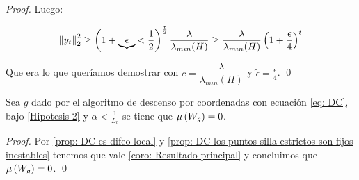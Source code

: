 \begin{proof}
	Luego:
	
	\begin{equation*}
		\left\lVert y_t\right\rVert_2^2 \geq \left(1+ \underbrace{\epsilon}{< \frac{1}{2}}\right)^{\frac{t}{2}}{\dfrac{\lambda}{\lambda_{min}(H)}} \geq {\dfrac{\lambda}{\lambda_{min}(H)}}\left(1 + \frac{\epsilon}{4}\right)^t
	\end{equation*}
	
	Que era lo que quer\'iamos demostrar con $c = \dfrac{\lambda}{\lambda_{min}(H)}$ y $\tilde{\epsilon} = \frac{\epsilon}{4}$. \qed

\end{proof}

\begin{corollary}
	\label{coro: DC converge a minimos}
	Sea $g$ dado por el algoritmo de descenso por coordenadas con ecuaci\'on \ref{eq: DC}, bajo \ref{Hipotesis 2} y $\alpha < \frac{1}{L_b}$ se tiene que $\mu\left(W_g\right) = 0$.
\end{corollary}

\begin{proof}
	Por \ref{prop: DC es difeo local} y \ref{prop: DC los puntos silla estrictos son fijos inestables} tenemos que vale \ref{coro: Resultado principal} y concluimos que $\mu \left(W_g\right) = 0$. \qed
\end{proof}
